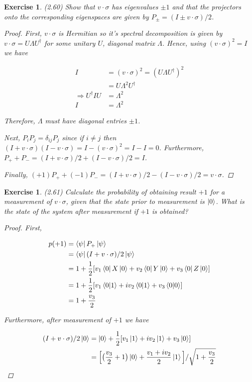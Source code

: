 \documentclass[11pt]{article}
\newcommand\0{\mathbf{0}}
\newcommand\<{\langle}
\renewcommand\>{\rangle}
\renewcommand\implies{\Rightarrow}
\newtheorem{exercise}[theorem]{Exercise}
\begin{document}
\begin{exercise}
	(2.60) Show that $v \cdot \sigma$ has eigenvalues $\pm 1$ and that the projectors onto the corresponding eigenspaces are given by $P_{\pm} = (I \pm v \cdot \sigma)/2$.

\begin{proof}
	First, $v\cdot \sigma$ is Hermitian so it's spectral decomposition is given by $v \cdot \sigma = U \Lambda U^\dag$ for some unitary $U$, diagonal matrix $\Lambda$. Hence, using $(v\cdot \sigma)^2 = I$ we have
	
	\begin{align*}
		I &= (v \cdot \sigma)^2 = (U \Lambda U^\dag)^2 \\
		&= U \Lambda^2 U^\dag \\
		\implies U^\dag I U &= \Lambda^2 \\
		I & = \Lambda^2
	\end{align*}

Therefore, $\Lambda$ must have diagonal entries $\pm 1$. 

Next, $P_i P_j = \delta_{ij}P_j$ since if $i \neq j$ then $(I + v \cdot \sigma)(I - v\cdot \sigma) = I - (v \cdot \sigma)^2 = I - I = 0$. Furthermore, $P_+ + P_- = (I + v \cdot \sigma)/2 + (I - v \cdot \sigma)/2 = I$. 

Finally, $(+1)P_+ + (-1)P_- = (I + v \cdot \sigma)/2 - (I - v \cdot \sigma)/2 = v \cdot \sigma$. 
\end{proof}
\end{exercise}

\begin{exercise}
	(2.61) Calculate the probability of obtaining result $+1$ for a measurement of $v \cdot \sigma$, given that the state prior to measurement is $\ket{0}$. What is the state of the system after measurement if $+1$ is obtained?
	
	\begin{proof}
	
	First, 
	
		\begin{align*}
			p(+1) &= \bra{\psi} P_+ \ket{\psi} \\
			&= \bra{\psi}(I + v \cdot \sigma)/2\ket{\psi} \\
			&= 1 + \frac{1}{2}[ v_1\bra{0} X \ket{0} + v_2\bra{0} Y \ket{0} + v_3\bra{0} Z \ket{0}] \\
			&= 1 + \frac{1}{2}[ v_1\bra{0}\ket{1} + iv_2\bra{0}\ket{1} + v_3\bra{0}\ket{0}] \\
			&= 1+ \frac{v_3}{2}
		\end{align*}
	
	Furthermore, after measurement of $+1$ we have
	
	\begin{align*}
		(I + v \cdot \sigma)/2\ket{0} &= \ket{0} + \frac{1}{2}[ v_1\ket{1} + iv_2\ket{1} + v_3\ket{0}] \\
		&= \Big[\big(\frac{v_3}{2} + 1\big)\ket{0} + \frac{v_1 + iv_2}{2}\ket{1}\Big]/\sqrt{1+ \frac{v_3}{2}}
	\end{align*}

	\end{proof}
\end{exercise}
\end{document}
